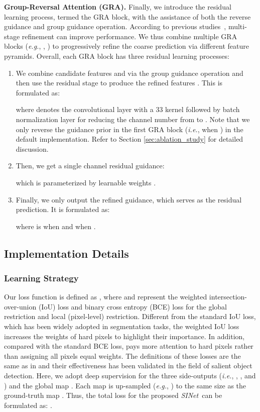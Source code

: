 \documentclass[10pt,journal,compsoc]{IEEEtran}
\def\ie{\emph{i.e.}}
\def\eg{\emph{e.g.}}
\newcommand{\myPara}[1]{\vspace{6pt}\noindent\textbf{#1}\qquad }
\newcommand{\secref}[1]{Section \ref{#1}}
\newcommand{\Rev}[1]{\textcolor{black}{#1}}
\def\ournewmodel{\emph{SINet}}
\begin{document}
\myPara{Group-Reversal Attention (GRA).}
Finally, we introduce the residual learning process, termed the GRA block, 
with the assistance of both the reverse guidance and group guidance operation.
According to previous studies~\cite{qin2019basnet,xu2017deep}, 
multi-stage refinement can improve performance.
We thus combine multiple GRA blocks 
(\eg, , ) to progressively 
refine the coarse prediction via different feature pyramids.
Overall, each GRA block has three residual learning processes:
\begin{enumerate}
\item [\textit{i)}] We combine candidate features  and  
  via the group guidance operation and then use the residual stage 
  to produce the refined features . 
  This is formulated as:

where  denotes the convolutional layer with a 33 
  kernel followed by batch normalization layer 
  for reducing the channel number from \Rev{} to . 
  Note that we only reverse the guidance prior in the first GRA block 
  (\ie, when ) in the default implementation. 
  Refer to \secref{sec:ablation_study} for detailed discussion.
    
\item [\textit{ii)}] Then, we get a single channel residual guidance:

  which is parameterized by learnable weights .
  
\item [\textit{iii)}] Finally, we only output the refined guidance, 
  which serves as the residual prediction. It is formulated as:

  where  is  when  
  and  when .

\end{enumerate}




\subsection{Implementation Details}\label{sec:implementation_details}

\subsubsection{Learning Strategy}
Our loss function is defined as 
, 
where  and  represent 
the weighted intersection-over-union (IoU) loss and binary cross entropy (BCE) 
loss for the global restriction and local (pixel-level) restriction.
Different from the standard IoU loss, 
which has been widely adopted in segmentation tasks, 
the weighted IoU loss increases the weights of hard pixels 
to highlight their importance.
In addition, compared with the standard BCE loss, 
 pays more attention to hard pixels rather than 
assigning all pixels equal weights. 
The definitions of these losses are the same as in
\cite{qin2019basnet,wei2019f3net} and their effectiveness has been validated 
in the field of salient object detection.
Here, we adopt deep supervision for the three side-outputs 
(\ie, , , and ) and the global map .
Each map is up-sampled (\eg, ) to the same size as the 
ground-truth map .
Thus, the total loss for the proposed \ournewmodel~can be formulated as:
.
\end{document}
